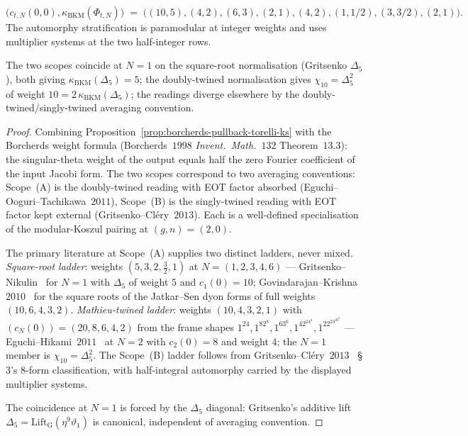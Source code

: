 \begin{theorem}[Chain-level modular-Koszul bridge at $d = 3$, two scopes]
\begin{description}
\[
 \bigl(c_{t,N}(0, 0), \kappa_{\mathrm{BKM}}(\Phi_{t,N})\bigr)
 \;=\; \bigl((10, 5), (4, 2), (6, 3), (2, 1), (4, 2), (1, 1/2), (3, 3/2), (2, 1)\bigr).
\]
The automorphy stratification is paramodular at integer weights and
uses multiplier systems at the two half-integer rows.
\end{description}
The two scopes coincide at $N = 1$ on the square-root normalisation
(Gritsenko $\Delta_5$), both giving
$\kappa_{\mathrm{BKM}}(\Delta_5) = 5$; the doubly-twined normalisation
gives $\chi_{10} = \Delta_5^2$ of weight
$10 = 2\,\kappa_{\mathrm{BKM}}(\Delta_5)$; the readings diverge
elsewhere by the doubly-twined/singly-twined averaging convention.
\end{theorem}

\begin{proof}
Combining Proposition~\ref{prop:borcherds-pullback-torelli-ks} with
the Borcherds weight formula (Borcherds~$1998$
\emph{Invent.~Math.}\ $132$ Theorem~$13.3$): the singular-theta weight
of the output equals half the zero Fourier coefficient of the input
Jacobi form. The two scopes correspond to two averaging conventions:
Scope~(A) is the doubly-twined reading with EOT factor absorbed
(Eguchi--Ooguri--Tachikawa~$2011$), Scope~(B) is the
singly-twined reading with EOT factor kept external
(Gritsenko--Cl\'ery~$2013$). Each is a well-defined specialisation
of the modular-Koszul pairing at $(g, n) = (2, 0)$.

The primary literature at Scope~(A) supplies two distinct ladders,
never mixed. \emph{Square-root ladder}: weights
$(5, 3, 2, \tfrac32, 1)$ at $N = (1, 2, 3, 4, 6)$ ---
Gritsenko--Nikulin~\cite{GritsenkoNikulin1995} for $N = 1$ with
$\Delta_5$ of weight $5$ and $c_1(0) = 10$;
Govindarajan--Krishna~$2010$~\cite{GovindarajanKrishna2010} for the
square roots of the Jatkar--Sen dyon forms of full weights
$(10, 6, 4, 3, 2)$. \emph{Mathieu-twined ladder}: weights
$(10, 4, 3, 2, 1)$ with $(c_N(0)) = (20, 8, 6, 4, 2)$ from the frame
shapes $1^{24}, 1^82^8, 1^63^6, 1^42^24^4, 1^22^23^26^2$ ---
Eguchi--Hikami~$2011$~\cite{EguchiHikami2011} at $N = 2$ with
$c_2(0) = 8$ and weight $4$; the $N = 1$ member is
$\chi_{10} = \Delta_5^2$. The
Scope~(B) ladder follows from Gritsenko--Cl\'ery~$2013$~\cite{GritsenkoClery2013}
\S$3$'s $8$-form classification, with half-integral automorphy carried
by the displayed multiplier systems.

The coincidence at $N = 1$ is forced by the $\Delta_5$ diagonal:
Gritsenko's additive lift $\Delta_5 = \mathrm{Lift}_{\mathrm{G}}
(\eta^9 \vartheta_1)$ is canonical, independent of averaging convention.


\end{proof}
